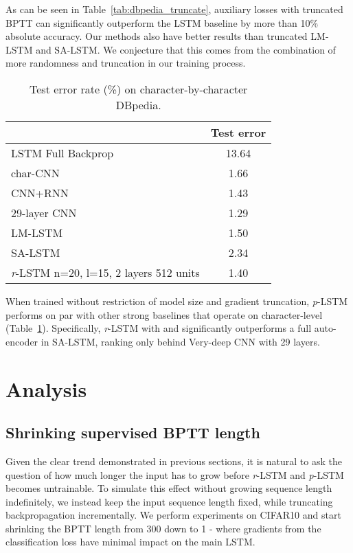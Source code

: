 \documentclass{article}
\newcommand{\rlstm}{{\it r}-LSTM}
\newcommand{\plstm}{{\it p}-LSTM}
\begin{document}
As can be seen in Table~\ref{tab:dbpedia_truncate}, auxiliary losses with truncated BPTT can significantly outperform the LSTM baseline by more than 10\% absolute accuracy. Our methods also have better results than truncated LM-LSTM and SA-LSTM. We conjecture that this comes from the combination of more randomness and truncation in our training process.

\begin{table}[htb]
\caption{Test error rate (\%) on character-by-character DBpedia.}
\label{tab:dbpedia}
\vskip 0.15in
\begin{center}
\begin{small}
\begin{tabular}{lc}
\toprule
 & Test error \\ 
\midrule
LSTM Full Backprop~\cite{dai2015semi}    & 13.64 \\ 
char-CNN~\cite{zhang2015text} & 1.66 \\
CNN+RNN~\cite{xiaocrnn16} & 1.43 \\
29-layer CNN~\cite{ConneauVDCNN16} & 1.29 \\
LM-LSTM~\cite{dai2015semi} & 1.50 \\
SA-LSTM~\cite{dai2015semi} & 2.34 \\
\midrule
\rlstm{} n=20, l=15, 2 layers 512 units & 1.40 \\
\bottomrule
\end{tabular}
\end{small}
\end{center}
\vskip -0.1in
\end{table}

When trained without restriction of model size and gradient truncation, \plstm{} performs on par with other strong baselines that operate on character-level (Table~\ref{tab:dbpedia}). Specifically, \rlstm{} with  and   significantly outperforms a full auto-encoder in SA-LSTM, ranking only behind Very-deep CNN with 29 layers.

\section{Analysis}

\subsection{Shrinking supervised BPTT length}

Given the clear trend demonstrated in previous sections, it is natural to ask the question of how much longer the input has to grow before \rlstm{} and \plstm{} becomes untrainable. To simulate this effect without growing sequence length indefinitely, we instead keep the input sequence length fixed, while truncating backpropagation incrementally. We perform experiments on CIFAR10 and start shrinking the BPTT length from 300 down to 1 - where gradients from the classification loss have minimal impact on the main LSTM.
\end{document}
